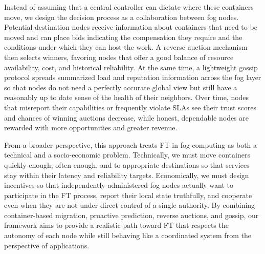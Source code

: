 \documentclass{article}
\begin{document}
Instead of assuming that a central controller can dictate where these containers move, we design the decision process as a collaboration between fog nodes. Potential destination nodes receive information about containers that need to be moved and can place bids indicating the compensation they require and the conditions under which they can host the work. A reverse auction mechanism then selects winners, favoring nodes that offer a good balance of resource availability, cost, and historical reliability. At the same time, a lightweight gossip protocol spreads summarized load and reputation information across the fog layer so that nodes do not need a perfectly accurate global view but still have a reasonably up to date sense of the health of their neighbors. Over time, nodes that misreport their capabilities or frequently violate SLAs see their trust scores and chances of winning auctions decrease, while honest, dependable nodes are rewarded with more opportunities and greater revenue.


From a broader perspective, this approach treats FT in fog computing as both a technical and a socio-economic problem. Technically, we must move containers quickly enough, often enough, and to appropriate destinations so that services stay within their latency and reliability targets. Economically, we must design incentives so that independently administered fog nodes actually want to participate in the FT process, report their local state truthfully, and cooperate even when they are not under direct control of a single authority. By combining container-based migration, proactive prediction, reverse auctions, and gossip, our framework aims to provide a realistic path toward FT that respects the autonomy of each node while still behaving like a coordinated system from the perspective of applications.
\end{document}
